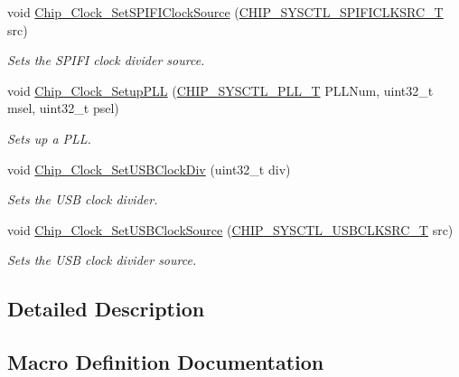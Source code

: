 \begin{DoxyCompactItemize}
void \hyperlink{group__CLOCK__17XX__40XX_ga5f9e0080824fdcbca2d70f277302da12}{Chip\+\_\+\+Clock\+\_\+\+Set\+S\+P\+I\+F\+I\+Clock\+Source} (\hyperlink{group__CLOCK__17XX__40XX_ga55d8797a3b68191ced784240378f74ac}{C\+H\+I\+P\+\_\+\+S\+Y\+S\+C\+T\+L\+\_\+\+S\+P\+I\+F\+I\+C\+L\+K\+S\+R\+C\+\_\+T} src)
\begin{DoxyCompactList}\small\item\em Sets the S\+P\+I\+FI clock divider source. \end{DoxyCompactList}\item 
void \hyperlink{group__CLOCK__17XX__40XX_gaf4a2dd4c6aae5d6b830f7cf529ec8773}{Chip\+\_\+\+Clock\+\_\+\+Setup\+P\+LL} (\hyperlink{group__SYSCTL__17XX__40XX_ga5f5478a201b021ed04a0724bff524c4b}{C\+H\+I\+P\+\_\+\+S\+Y\+S\+C\+T\+L\+\_\+\+P\+L\+L\+\_\+T} P\+L\+L\+Num, uint32\+\_\+t msel, uint32\+\_\+t psel)
\begin{DoxyCompactList}\small\item\em Sets up a P\+LL. \end{DoxyCompactList}\item 
void \hyperlink{group__CLOCK__17XX__40XX_gae63a884704ec0b314373e34165f62963}{Chip\+\_\+\+Clock\+\_\+\+Set\+U\+S\+B\+Clock\+Div} (uint32\+\_\+t div)
\begin{DoxyCompactList}\small\item\em Sets the U\+SB clock divider. \end{DoxyCompactList}\item 
void \hyperlink{group__CLOCK__17XX__40XX_ga4836fb1246978d20cbbf54d7ca1bff5a}{Chip\+\_\+\+Clock\+\_\+\+Set\+U\+S\+B\+Clock\+Source} (\hyperlink{group__CLOCK__17XX__40XX_ga0ba14bd48363645f607b49fbcc8624df}{C\+H\+I\+P\+\_\+\+S\+Y\+S\+C\+T\+L\+\_\+\+U\+S\+B\+C\+L\+K\+S\+R\+C\+\_\+T} src)
\begin{DoxyCompactList}\small\item\em Sets the U\+SB clock divider source. \end{DoxyCompactList}\end{DoxyCompactItemize}


\subsection{Detailed Description}


\subsection{Macro Definition Documentation}
